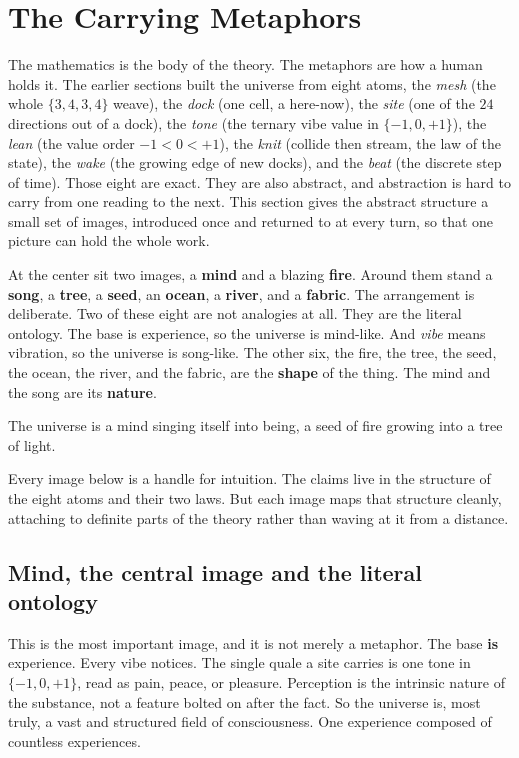\section{The Carrying Metaphors}

The mathematics is the body of the theory. The metaphors are how a human holds it. The earlier sections built the universe from eight atoms, the \emph{mesh} (the whole $\{3,4,3,4\}$ weave), the \emph{dock} (one cell, a here-now), the \emph{site} (one of the $24$ directions out of a dock), the \emph{tone} (the ternary vibe value in $\{-1,0,+1\}$), the \emph{lean} (the value order $-1 < 0 < +1$), the \emph{knit} (collide then stream, the law of the state), the \emph{wake} (the growing edge of new docks), and the \emph{beat} (the discrete step of time). Those eight are exact. They are also abstract, and abstraction is hard to carry from one reading to the next. This section gives the abstract structure a small set of images, introduced once and returned to at every turn, so that one picture can hold the whole work.

At the center sit two images, a \textbf{mind} and a blazing \textbf{fire}. Around them stand a \textbf{song}, a \textbf{tree}, a \textbf{seed}, an \textbf{ocean}, a \textbf{river}, and a \textbf{fabric}. The arrangement is deliberate. Two of these eight are not analogies at all. They are the literal ontology. The base is experience, so the universe is mind-like. And \emph{vibe} means vibration, so the universe is song-like. The other six, the fire, the tree, the seed, the ocean, the river, and the fabric, are the \textbf{shape} of the thing. The mind and the song are its \textbf{nature}.

\begin{principle}
The universe is a mind singing itself into being, a seed of fire growing into a tree of light.
\end{principle}

Every image below is a handle for intuition. The claims live in the structure of the eight atoms and their two laws. But each image maps that structure cleanly, attaching to definite parts of the theory rather than waving at it from a distance.

\subsection{Mind, the central image and the literal ontology}

This is the most important image, and it is not merely a metaphor. The base \textbf{is} experience. Every vibe notices. The single quale a site carries is one tone in $\{-1,0,+1\}$, read as pain, peace, or pleasure. Perception is the intrinsic nature of the substance, not a feature bolted on after the fact. So the universe is, most truly, a vast and structured field of consciousness. One experience composed of countless experiences.

